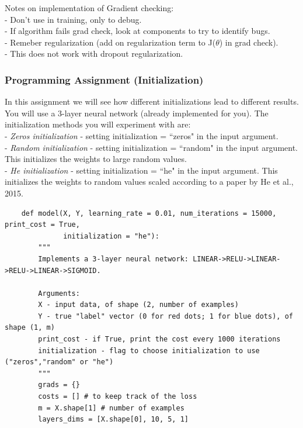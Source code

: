 \documentclass[11pt, a4paper]{article}
\begin{document}
\begin{spacing}{1.1}
	Notes on implementation of Gradient checking: \\
	\hspace*{3mm} - Don't use in training, only to debug. \\
	\hspace*{3mm} - If algorithm fails grad check, look at components to try to identify bugs. \\
	\hspace*{3mm} - Remeber regularization (add on regularization term to J($\theta$) in grad check). \\
	\hspace*{3mm} - This does not work with dropout regularization. \newpage

	\subsubsection{Programming Assignment (Initialization)}
	In this assignment we will see how different initializations lead to different results. You will use a 3-layer neural network (already implemented for you). The initialization methods you will experiment with are: \\
	\hspace*{3mm} - \textit{Zeros initialization} - setting initialization = ``zeros" in the input argument. \\
	\hspace*{3mm} - \textit{Random initialization} - setting initialization = ``random" in the input argument. This initializes the \hspace*{6.5mm} weights to large random values.  \\
	\hspace*{3mm} - \textit{He initialization} - setting initialization = ``he" in the input argument. This initializes the weights \hspace*{6.5mm} to random values scaled according to a paper by He et al., 2015.
	\begin{lstlisting}
	def model(X, Y, learning_rate = 0.01, num_iterations = 15000, print_cost = True, 
	          initialization = "he"):
		"""
		Implements a 3-layer neural network: LINEAR->RELU->LINEAR->RELU->LINEAR->SIGMOID.
		
		Arguments:
		X - input data, of shape (2, number of examples)
		Y - true "label" vector (0 for red dots; 1 for blue dots), of shape (1, m)
		print_cost - if True, print the cost every 1000 iterations
		initialization - flag to choose initialization to use ("zeros","random" or "he")
		"""
		grads = {}
		costs = [] # to keep track of the loss
		m = X.shape[1] # number of examples
		layers_dims = [X.shape[0], 10, 5, 1]
		

\end{lstlisting}
\end{spacing}
\end{document}
